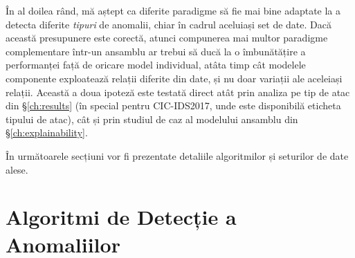 În al doilea rând, mă aștept ca diferite paradigme să fie mai bine adaptate la a detecta diferite \emph{tipuri} de anomalii, chiar în cadrul aceluiași set de date. Dacă această presupunere este corectă, atunci compunerea mai multor paradigme complementare într-un ansamblu ar trebui să ducă la o îmbunătățire a performanței față de oricare model individual, atâta timp cât modelele componente exploatează relații diferite din date, și nu doar variații ale aceleiași relații. Această a doua ipoteză este testată direct atât prin analiza pe tip de atac din \S\ref{ch:results} (în special pentru CIC-IDS2017, unde este disponibilă eticheta tipului de atac), cât și prin studiul de caz al modelului ansamblu din \S\ref{ch:explainability}.

În următoarele secțiuni vor fi prezentate detaliile algoritmilor și seturilor de date alese.



\section{Algoritmi de Detecție a Anomaliilor}
\label{sec:paradigms}

